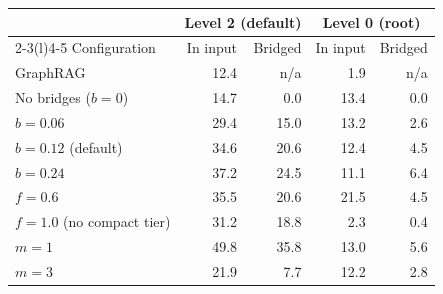 \begin{tabular}{@{}lrrrr@{}}
\toprule
 & \multicolumn{2}{c}{Level 2 (default)} & \multicolumn{2}{c}{Level 0 (root)} \\
\cmidrule(lr){2-3}\cmidrule(l){4-5}
Configuration & In input & Bridged & In input & Bridged \\
\midrule
GraphRAG & 12.4 & n/a & 1.9 & n/a \\
\midrule
No bridges ($b{=}0$) & 14.7 & 0.0 & 13.4 & 0.0 \\
$b{=}0.06$ & 29.4 & 15.0 & 13.2 & 2.6 \\
$b{=}0.12$ (default) & 34.6 & 20.6 & 12.4 & 4.5 \\
$b{=}0.24$ & 37.2 & 24.5 & 11.1 & 6.4 \\
$f{=}0.6$ & 35.5 & 20.6 & 21.5 & 4.5 \\
$f{=}1.0$ (no compact tier) & 31.2 & 18.8 & 2.3 & 0.4 \\
$m{=}1$ & 49.8 & 35.8 & 13.0 & 5.6 \\
$m{=}3$ & 21.9 & 7.7 & 12.2 & 2.8 \\
\bottomrule
\end{tabular}
